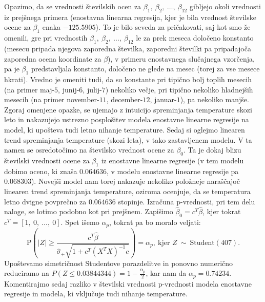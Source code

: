 \documentclass{article}
\begin{document}
Opazimo, da se vrednosti številskih ocen za $\beta_1,~\beta_2,~\dots,~\beta_{12}$ gibljejo okoli vrednosti iz prejšnega primera (enostavna linearna regresija, kjer je bila vrednost številske ocene za $\beta_1$ enaka $-125.5905$). 
To je bilo seveda za pričakovati, saj kot smo že omenili, gre pri vrednostih $\beta_1,~\beta_2,~\dots,~\beta_{12}$ le za prek meseca določeno konstanto (mesecu pripada njegova zaporedna številka, zaporedni številki pa pripadajoča zaporedna ocena koordinate za $\beta$), v primeru enostavnega slučajnega vzorčenja, pa je $\beta_1$ predstavljala konstanto, določeno ne glede na mesec (torej za vse mesece hkrati). 
Vredno je omeniti tudi, da so konstante pri tipično bolj toplih mesecih (na primer maj-$5$, junij-$6$, julij-$7$) nekoliko večje, pri tipično nekoliko hladnejših mesecih (na primer november-$11$, december-$12$, januar-$1$), pa nekoliko manjše.
Zgoraj omenjene opazke, se ujemajo z intuicijo spreminjanja temperature skozi leto in nakazujejo ustrezno posplošitev modela enostavne linearne regresije na model, ki upošteva tudi letno nihanje temperature. 
\newline
\newline
Sedaj si oglejmo linearen trend spreminjanja temperature (skozi leta), v tako zastavljenem modelu. V ta namen se osredotočimo na številsko vrednost ocene za $\beta_0$. Ta je dokaj blizu številski vrednosti ocene za $\beta_1$ iz enostavne linearne regresije (v tem modelu dobimo oceno, ki znaša $0.064636$, v modelu enostavne linearne regresije pa $0.068303$). 
Novejši model nam torej nakazuje nekoliko položneje naraščajoč linearen trend spreminjanja temperature, oziroma ocenjuje, da se temperatura letno dvigne povprečno za $0.064636$ stopinje.
\newline
\newline 
Izračuna p-vrednosti, pri tem delu naloge, se lotimo podobno kot pri prejšnem. Zapišimo $\hat{\beta}_0 = c^T\hat{\beta}$, kjer tokrat $c^T = [1,~0,~\dots,~0]$.
Spet išemo $\alpha_p$, tokrat pa bo moralo veljati:
$$
\text{P}\left(|Z| \geq \frac{c^T\hat{\beta}}{\hat{\sigma}_{+}\sqrt{1 + c^T(X^TX)^{-1}c}}\right) = \alpha_p,~\text{kjer }Z~\sim~\text{Student}(407). 
$$
Upoštevamo simetričnost Studentove porazdelitve in ponovno numerično reduciramo na $P(Z \leq 0.03844344) = 1 - \frac{\alpha_p}{2}$, kar nam da $\alpha_p = 0.74234$.
\newline
\newline
Komentirajmo sedaj razliko v številski vrednosti p-vrednosti modela enostavne regresije in modela, ki vključuje tudi nihanje temperature. 
\end{document}
